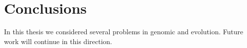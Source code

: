 \chapter{Conclusions}

In this thesis we considered several problems in genomic and evolution.
Future work will continue in this direction.